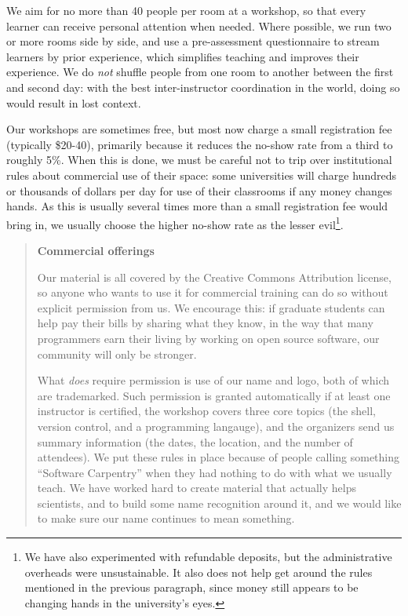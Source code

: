 \documentclass[10pt,a4paper,twocolumn]{article}
\begin{document}
We aim for no more than 40 people per room at a workshop, so that
every learner can receive personal attention when needed.  Where
possible, we run two or more rooms side by side, and use a
pre-assessment questionnaire to stream learners by prior experience,
which simplifies teaching and improves their experience.  We do
\emph{not} shuffle people from one room to another between the first
and second day: with the best inter-instructor coordination in the
world, doing so would result in lost context.

Our workshops are sometimes free, but most now charge a small
registration fee (typically \$20-40), primarily because it reduces the
no-show rate from a third to roughly 5\%.  When this is done, we must
be careful not to trip over institutional rules about commercial use
of their space: some universities will charge hundreds or thousands of
dollars per day for use of their classrooms if any money changes
hands.  As this is usually several times more than a small
registration fee would bring in, we usually choose the higher no-show
rate as the lesser evil\footnote{We have also experimented with
  refundable deposits, but the administrative overheads were
  unsustainable.  It also does not help get around the rules mentioned
  in the previous paragraph, since money still appears to be changing
  hands in the university's eyes.}.

\begin{quote}
\textbf{Commercial offerings}

Our material \cite{swcsite,swcgithub} is all covered by the Creative
Commons Attribution license, so anyone who wants to use it for
commercial training can do so without explicit permission from us. We
encourage this: if graduate students can help pay their bills by
sharing what they know, in the way that many programmers earn their
living by working on open source software, our community will only be
stronger.

What \emph{does} require permission is use of our name and logo, both
of which are trademarked.  Such permission is granted automatically if
at least one instructor is certified, the workshop covers three core
topics (the shell, version control, and a programming langauge), and
the organizers send us summary information (the dates, the location,
and the number of attendees).  We put these rules in place because of
people calling something ``Software Carpentry'' when they had nothing
to do with what we usually teach. We have worked hard to create
material that actually helps scientists, and to build some name
recognition around it, and we would like to make sure our name
continues to mean something.
\end{quote}
\end{document}
